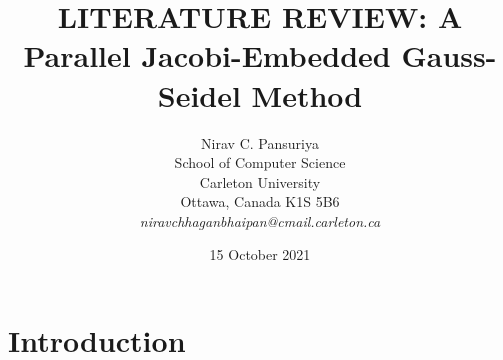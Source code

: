 \documentclass[11pt]{article}       %
\begin{document}


\title{LITERATURE REVIEW: A Parallel Jacobi-Embedded Gauss-Seidel Method}


\author{
Nirav C. Pansuriya\\
School of Computer Science\\
Carleton University\\
Ottawa, Canada K1S 5B6\\
{\em niravchhaganbhaipan@cmail.carleton.ca}
} %
\date{15 October 2021}
\maketitle



\section{Introduction} \label{intro}
\end{document}
